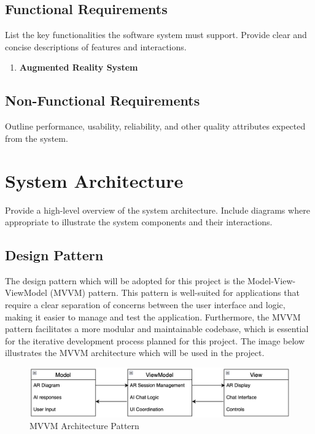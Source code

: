 \documentclass[12pt]{article}
\begin{document}
    \subsection{Functional Requirements}
    List the key functionalities the software system must support. Provide clear and concise descriptions of features and interactions.

    \begin{enumerate}
        \item \textbf{Augmented Reality System}
    \end{enumerate}

    \subsection{Non-Functional Requirements}
    Outline performance, usability, reliability, and other quality attributes expected from the system.

\section{System Architecture}
Provide a high-level overview of the system architecture. Include diagrams where appropriate to illustrate the system components and their interactions.

    \subsection{Design Pattern}

    The design pattern which will be adopted for this project is the Model-View-ViewModel (MVVM) pattern. This pattern is well-suited for applications that require a clear separation
    of concerns between the user interface and logic, making it easier to manage and test the application. Furthermore, the MVVM pattern facilitates a more modular and maintainable
    codebase, which is essential for the iterative development process planned for this project. The image below illustrates the MVVM architecture which will be used in the project.

    \begin{figure}[H]
        \centering
        \includegraphics[width=\textwidth]{Pattern.png}
        \caption{MVVM Architecture Pattern}
        \label{fig:Pattern}
    \end{figure}
\end{document}
